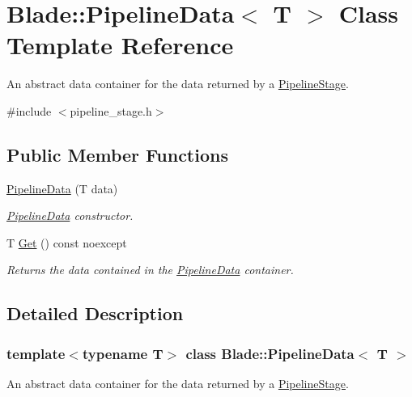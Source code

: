 \hypertarget{class_blade_1_1_pipeline_data}{}\section{Blade\+:\+:Pipeline\+Data$<$ T $>$ Class Template Reference}
\label{class_blade_1_1_pipeline_data}


An abstract data container for the data returned by a \hyperlink{class_blade_1_1_pipeline_stage}{Pipeline\+Stage}.  




{\ttfamily \#include $<$pipeline\+\_\+stage.\+h$>$}

\subsection*{Public Member Functions}
\begin{DoxyCompactItemize}
\item 
\hyperlink{class_blade_1_1_pipeline_data_a0ec5d639a520d7c39593d62084788398}{Pipeline\+Data} (T data)
\begin{DoxyCompactList}\small\item\em \hyperlink{class_blade_1_1_pipeline_data}{Pipeline\+Data} constructor. \end{DoxyCompactList}\item 
T \hyperlink{class_blade_1_1_pipeline_data_a5fabd7938e03537063559256d21c8253}{Get} () const noexcept
\begin{DoxyCompactList}\small\item\em Returns the data contained in the \hyperlink{class_blade_1_1_pipeline_data}{Pipeline\+Data} container. \end{DoxyCompactList}\end{DoxyCompactItemize}


\subsection{Detailed Description}
\subsubsection*{template$<$typename T$>$\newline
class Blade\+::\+Pipeline\+Data$<$ T $>$}

An abstract data container for the data returned by a \hyperlink{class_blade_1_1_pipeline_stage}{Pipeline\+Stage}. 


